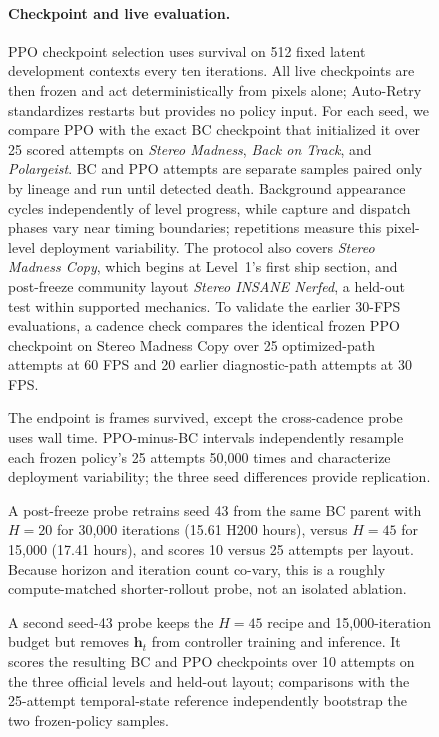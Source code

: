 \begin{figure}[!htbp]
\paragraph{Checkpoint and live evaluation.}
PPO checkpoint selection uses survival on 512 fixed latent development contexts every ten iterations.
All live checkpoints are then frozen and act deterministically from pixels alone; Auto-Retry standardizes restarts but provides no policy input.
For each seed, we compare PPO with the exact BC checkpoint that initialized it over 25 scored attempts on \emph{Stereo Madness}, \emph{Back on Track}, and \emph{Polargeist}.
BC and PPO attempts are separate samples paired only by lineage and run until detected death.
Background appearance cycles independently of level progress, while capture and dispatch phases vary near timing boundaries; repetitions measure this pixel-level deployment variability.
The protocol also covers \emph{Stereo Madness Copy}, which begins at Level~1's first ship section, and post-freeze community layout \emph{Stereo INSANE Nerfed}, a held-out test within supported mechanics.
To validate the earlier 30-FPS evaluations, a cadence check compares the identical frozen PPO checkpoint on Stereo Madness Copy over 25 optimized-path attempts at 60 FPS and 20 earlier diagnostic-path attempts at 30 FPS.

The endpoint is frames survived, except the cross-cadence probe uses wall time.
PPO-minus-BC intervals independently resample each frozen policy's 25 attempts 50,000 times and characterize deployment variability; the three seed differences provide replication.

A post-freeze probe retrains seed 43 from the same BC parent with \(H=20\) for 30,000 iterations (15.61 H200 hours), versus \(H=45\) for 15,000 (17.41 hours), and scores 10 versus 25 attempts per layout.
Because horizon and iteration count co-vary, this is a roughly compute-matched shorter-rollout probe, not an isolated ablation.

A second seed-43 probe keeps the \(H=45\) recipe and 15,000-iteration budget but removes \(\mathbf h_t\) from controller training and inference.
It scores the resulting BC and PPO checkpoints over 10 attempts on the three official levels and held-out layout; comparisons with the 25-attempt temporal-state reference independently bootstrap the two frozen-policy samples.


\end{figure}
